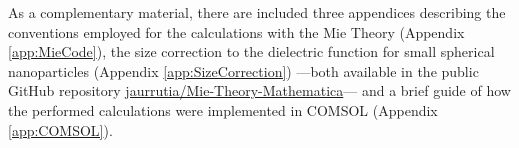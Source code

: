 As a complementary material, there are included three appendices describing the conventions employed for the calculations with the Mie Theory (Appendix \ref{app:MieCode}), the size correction to the dielectric function for small spherical nanoparticles (Appendix \ref{app:SizeCorrection}) ---both available in the public GitHub repository \href{https://github.com/jaurrutia/Mie-Theory-Mathematica}{jaurrutia/Mie-Theory-Mathematica}--- and a brief guide of how the performed calculations were implemented in COMSOL (Appendix \ref{app:COMSOL}).





